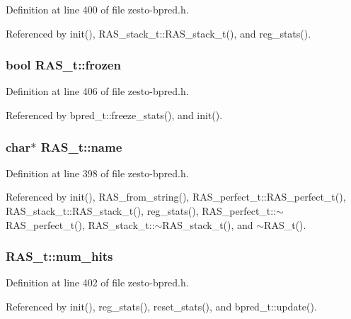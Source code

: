 Definition at line 400 of file zesto-bpred.h.

Referenced by init(), RAS\_\-stack\_\-t::RAS\_\-stack\_\-t(), and reg\_\-stats().
\subsubsection[{frozen}]{\setlength{\rightskip}{0pt plus 5cm}bool {\bf RAS\_\-t::frozen}\hspace{0.3cm}{\tt  [protected]}}\label{classRAS__t_23d8b517275399dd1938f9224352e16b}




Definition at line 406 of file zesto-bpred.h.

Referenced by bpred\_\-t::freeze\_\-stats(), and init().
\subsubsection[{name}]{\setlength{\rightskip}{0pt plus 5cm}char$\ast$ {\bf RAS\_\-t::name}\hspace{0.3cm}{\tt  [protected]}}\label{classRAS__t_46f76793b29dbda5e83fb1c703f005ff}




Definition at line 398 of file zesto-bpred.h.

Referenced by init(), RAS\_\-from\_\-string(), RAS\_\-perfect\_\-t::RAS\_\-perfect\_\-t(), RAS\_\-stack\_\-t::RAS\_\-stack\_\-t(), reg\_\-stats(), RAS\_\-perfect\_\-t::$\sim$RAS\_\-perfect\_\-t(), RAS\_\-stack\_\-t::$\sim$RAS\_\-stack\_\-t(), and $\sim$RAS\_\-t().
\subsubsection[{num\_\-hits}]{ {\bf RAS\_\-t::num\_\-hits}\hspace{0.3cm}{\tt  [protected]}}\label{classRAS__t_a7ec70afff01a487015d09903af6ec02}




Definition at line 402 of file zesto-bpred.h.

Referenced by init(), reg\_\-stats(), reset\_\-stats(), and bpred\_\-t::update().
